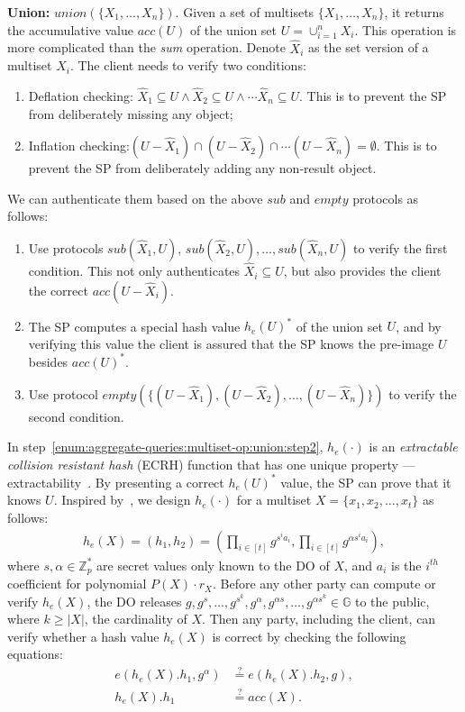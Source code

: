 \textbf{Union:} $union(\{X_1, \dots, X_n\})$.
Given a set of multisets $\{X_1, \dots, X_n\}$, it returns the accumulative value $acc(U)$ of the union set $U = \cup_{i=1}^n X_i$. This operation is more complicated than the \emph{sum} operation. Denote $\widehat{X}_i$ as the set version of a multiset $X_i$. The client needs to verify two conditions:
\begin{enumerate}
  \item Deflation checking: $\widehat{X}_1 \subseteq U \wedge \widehat{X}_2 \subseteq U \wedge \cdots \widehat{X}_n \subseteq U$. This is to prevent the SP from deliberately missing any object;
  \item Inflation checking:$(U - \widehat{X}_1) \cap (U - \widehat{X}_2) \cap \cdots (U - \widehat{X}_n) = \emptyset$. This is to prevent the SP from deliberately adding any non-result object.
\end{enumerate}
We can authenticate them based on the above $sub$ and $empty$ protocols as follows:
\begin{enumerate}
  \item Use protocols $sub(\widehat{X}_1, U)$, $sub(\widehat{X}_2, U), \dots, sub(\widehat{X}_n, U)$ to verify the first condition. This not only authenticates $\widehat{X}_i \subseteq U$, but also provides the client the correct $acc(U-\widehat{X}_i)$.
  \item The SP computes a special hash value ${h_e(U)}^*$ of the union set $U$, and by verifying this value the client is assured that the SP knows the pre-image $U$ besides ${acc(U)}^*$.\label{enum:aggregate-queries:multiset-op:union:step2}
  \item Use protocol $empty(\{(U-\widehat{X}_1), (U-\widehat{X}_2), \dots, (U -\widehat{X}_n)\})$ to verify the second condition.
\end{enumerate}
In step~\ref{enum:aggregate-queries:multiset-op:union:step2}, $h_e(\cdot)$ is an \emph{extractable collision resistant hash} (ECRH) function that has one unique property --- extractability~\cite{10.1145/2090236.2090263}. By presenting a correct ${h_e(U)}^*$ value, the SP can prove that it knows $U$. Inspired by~\cite{10.1145/2090236.2090263}, we design $h_e(\cdot)$ for a multiset $X=\{x_1, x_2, \dots, x_t\}$ as follows:
\begin{align*}
  h_e(X) = (h_1, h_2) = (\prod_{i \in [t]} g^{s^i a_i}, \prod_{i \in [t]} g^{\alpha s^i a_i}),
\end{align*}
where $s, \alpha \in \mathbb{Z}_p^*$ are secret values only known to the DO of $X$, and $a_i$ is the $i^{th}$ coefficient for polynomial $P(X)\cdot r_X$. Before any other party can compute or verify $h_e(X)$, the DO releases $g, g^s, \dots, g^{s^k}, g^\alpha, g^{\alpha s}, \dots, g^{\alpha s^k} \in \mathbb{G}$ to the public, where $k \ge |X|$, the cardinality of $X$. Then any party, including the client, can verify whether a hash value $h_e(X)$ is correct by checking the following equations:
\begin{align*}
  e(h_e(X).h_1, g^\alpha) &\stackrel{?}{=} e(h_e(X).h_2, g), \\
  h_e(X).h_1 & \stackrel{?}{=} acc(X).
\end{align*}

